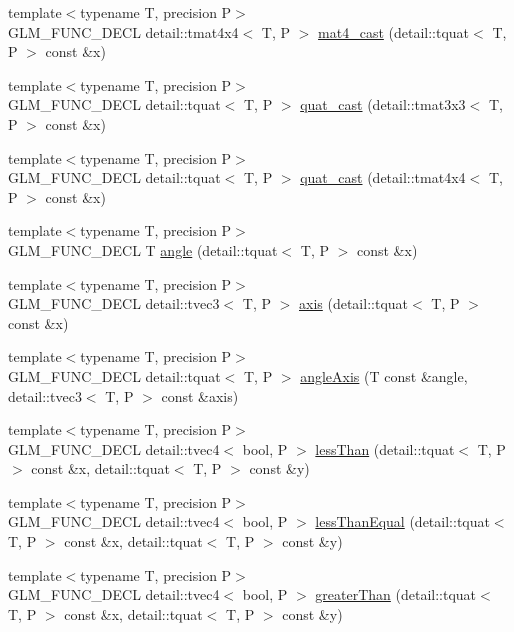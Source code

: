 \begin{CompactItemize}
\item 
{\footnotesize template$<$typename T, precision P$>$ }\\GLM\_\-FUNC\_\-DECL detail::tmat4x4$<$ T, P $>$ \hyperlink{group__gtc__quaternion_gbe87795cddd91732acb07830f8125a2d}{mat4\_\-cast} (detail::tquat$<$ T, P $>$ const \&x)
\item 
{\footnotesize template$<$typename T, precision P$>$ }\\GLM\_\-FUNC\_\-DECL detail::tquat$<$ T, P $>$ \hyperlink{group__gtc__quaternion_ga615768cdd09816fd42da38f484fb4c0}{quat\_\-cast} (detail::tmat3x3$<$ T, P $>$ const \&x)
\item 
{\footnotesize template$<$typename T, precision P$>$ }\\GLM\_\-FUNC\_\-DECL detail::tquat$<$ T, P $>$ \hyperlink{group__gtc__quaternion_ge2011ef54746786bc5a93314dfcf54b5}{quat\_\-cast} (detail::tmat4x4$<$ T, P $>$ const \&x)
\item 
{\footnotesize template$<$typename T, precision P$>$ }\\GLM\_\-FUNC\_\-DECL T \hyperlink{group__gtc__quaternion_g48c100d72c9c3295b75c9133ddbb83d1}{angle} (detail::tquat$<$ T, P $>$ const \&x)
\item 
{\footnotesize template$<$typename T, precision P$>$ }\\GLM\_\-FUNC\_\-DECL detail::tvec3$<$ T, P $>$ \hyperlink{group__gtc__quaternion_g5c243b588291c790bf1b5ec3f0f08d1b}{axis} (detail::tquat$<$ T, P $>$ const \&x)
\item 
{\footnotesize template$<$typename T, precision P$>$ }\\GLM\_\-FUNC\_\-DECL detail::tquat$<$ T, P $>$ \hyperlink{group__gtc__quaternion_g96dbce7a48d76fa63e65c4ba949a3bc4}{angleAxis} (T const \&angle, detail::tvec3$<$ T, P $>$ const \&axis)
\item 
{\footnotesize template$<$typename T, precision P$>$ }\\GLM\_\-FUNC\_\-DECL detail::tvec4$<$ bool, P $>$ \hyperlink{group__gtc__quaternion_gf0ab4cfbc0f3e16f060fa4dd501b5dc1}{lessThan} (detail::tquat$<$ T, P $>$ const \&x, detail::tquat$<$ T, P $>$ const \&y)
\item 
{\footnotesize template$<$typename T, precision P$>$ }\\GLM\_\-FUNC\_\-DECL detail::tvec4$<$ bool, P $>$ \hyperlink{group__gtc__quaternion_g43f2f8f0e9b252966c72f357fc834184}{lessThanEqual} (detail::tquat$<$ T, P $>$ const \&x, detail::tquat$<$ T, P $>$ const \&y)
\item 
{\footnotesize template$<$typename T, precision P$>$ }\\GLM\_\-FUNC\_\-DECL detail::tvec4$<$ bool, P $>$ \hyperlink{group__gtc__quaternion_g1ee107eeb1b58dcc19bd56b119b7e14e}{greaterThan} (detail::tquat$<$ T, P $>$ const \&x, detail::tquat$<$ T, P $>$ const \&y)

\end{CompactItemize}
